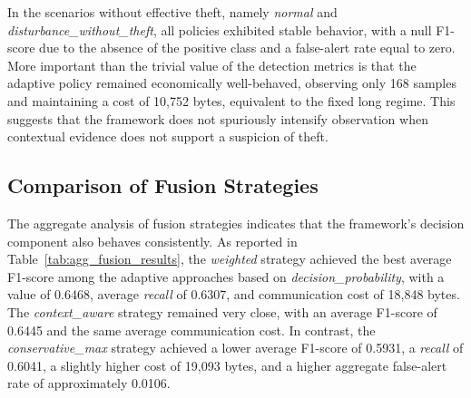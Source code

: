 \documentclass[journal]{IEEEtran}
\begin{document}
In the scenarios without effective theft, namely \textit{normal} and \textit{disturbance\_without\_theft}, all policies exhibited stable behavior, with a null F1-score due to the absence of the positive class and a false-alert rate equal to zero. More important than the trivial value of the detection metrics is that the adaptive policy remained economically well-behaved, observing only 168 samples and maintaining a cost of 10{,}752 bytes, equivalent to the fixed long regime. This suggests that the framework does not spuriously intensify observation when contextual evidence does not support a suspicion of theft.


\subsection{Comparison of Fusion Strategies}

The aggregate analysis of fusion strategies indicates that the framework's decision component also behaves consistently. As reported in Table~\ref{tab:agg_fusion_results}, the \textit{weighted} strategy achieved the best average F1-score among the adaptive approaches based on \textit{decision\_probability}, with a value of 0.6468, average \textit{recall} of 0.6307, and communication cost of 18{,}848 bytes. The \textit{context\_aware} strategy remained very close, with an average F1-score of 0.6445 and the same average communication cost. In contrast, the \textit{conservative\_max} strategy achieved a lower average F1-score of 0.5931, a \textit{recall} of 0.6041, a slightly higher cost of 19{,}093 bytes, and a higher aggregate false-alert rate of approximately 0.0106.

\end{document}
